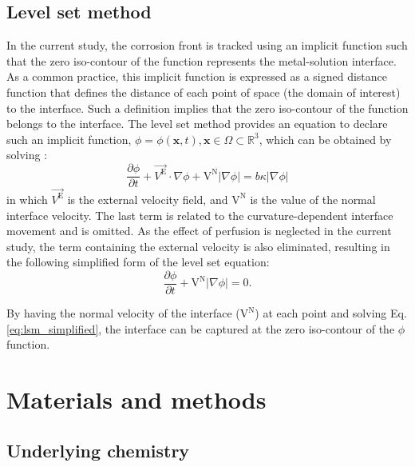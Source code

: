 \subsection{Level set method}

In the current study, the corrosion front is tracked using an implicit function such that the zero iso-contour of the function represents the metal-solution interface. As a common practice, this implicit function is expressed as a signed distance function that defines the distance of each point of space (the domain of interest) to the interface. Such a definition implies that the zero iso-contour of the function belongs to the interface. The level set method provides an equation to declare such an implicit function, $\phi=\phi(\mathbf{x},t), \mathbf{x} \in \Omega \subset \mathbb{R}^{3}$, which can be obtained by solving \cite{RonaldFedkiw2002}:
\begin{equation} \label{eq:lsm_full}
\frac{\partial \phi}{\partial t}+{\overrightarrow{V^\mathrm{E}} \cdot \nabla \phi}+{\mathrm{V}^\mathrm{N}|\nabla \phi|}={b \kappa|\nabla \phi|}
\end{equation}
in which $\overrightarrow{V^\mathrm{E}}$ is the external velocity field, and  $\mathrm{V}^\mathrm{N}$ is the value of the normal interface velocity. The last term is related to the curvature-dependent interface movement and is omitted. As the effect of perfusion is neglected in the current study, the term containing the external velocity is also eliminated, resulting in the following simplified form of the level set equation:
\begin{equation} \label{eq:lsm_simplified}
\frac{\partial \phi}{\partial t}+\mathrm{V}^\mathrm{N}|\nabla \phi|=0.
\end{equation}

By having the normal velocity of the interface ($\mathrm{V}^\mathrm{N}$) at each point and solving Eq. \ref{eq:lsm_simplified}, the interface can be captured at the zero iso-contour of the $\phi$ function.

\section{Materials and methods}


\subsection{Underlying chemistry}

